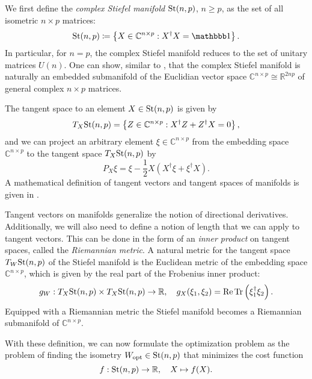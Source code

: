 \documentclass[encoding=utf8,british]{template/thesis}
\begin{document}
	We first define the \textit{complex Stiefel manifold} $\text{St}(n,p)$, $n \ge p$, as the set of all isometric $n\times p$ matrices:
	\begin{equation}
		\label{eq:Stiefel_manifold_definition}
		\Stiefel \coloneqq \left\{X\in\mathbb{C}^{n\times p}: X^\dagger X = \id\right\}.
	\end{equation}
	In particular, for $n = p$, the complex Stiefel manifold reduces to the set of unitary matrices $U(n)$. One can show, similar to \cite{cite:optimization_on_matrix_manifolds}, that the complex Stiefel manifold is naturally an embedded submanifold of the Euclidian vector space $\mathbb{C}^{n\times p} \cong \mathbb{R}^{2np}$ of general complex $n\times p$ matrices. \par
	The tangent space to an element $X\in\text{St}(n,p)$ is given by \cite{cite:optimization_on_matrix_manifolds, cite:riemannian_optimization_isometric_tensor_networks}
	\begin{equation}
		\label{eq:Stiefel_manifold_tangent_space}
		T_X \text{St}(n,p) = \left\{Z\in\mathbb{C}^{n\times p}:X^\dagger Z + Z^\dagger X = 0\right\},
	\end{equation}
	and we can project an arbitrary element $\xi \in \mathbb{C}^{n\times p}$ from the embedding space $\mathbb{C}^{n\times p}$ to the tangent space $T_X \text{St}(n,p)$ by \cite{cite:optimization_on_matrix_manifolds, cite:riemannian_optimization_isometric_tensor_networks}
	\begin{equation}
		\label{eq:Stiefel_manifold_project_to_tangent_space}
		P_X\xi = \xi - \frac{1}{2}X\left(X^\dagger\xi + \xi^\dagger X\right).
	\end{equation}
	A mathematical definition of tangent vectors and tangent spaces of manifolds is given in \cite{cite:optimization_on_matrix_manifolds}. \par
	Tangent vectors on manifolds generalize the notion of directional derivatives. Additionally, we will also need to define a notion of length that we can apply to tangent vectors. This can be done in the form of an \textit{inner product} on tangent spaces, called the \textit{Riemannian metric}. A natural metric for the tangent space $T_W \text{St}(n,p)$ of the Stiefel manifold is the Euclidean metric of the embedding space $\mathbb{C}^{n\times p}$, which is given by the real part of the Frobenius inner product:
	\begin{equation}
		\label{eq:Stiefel_manifold_riemannian_metric}
		g_W: T_X \text{St}(n,p) \times T_X \text{St}(n,p) \to \mathbb{R}, \quad g_X(\xi_1, \xi_2) = \operatorname{Re}\operatorname{Tr}\left(\xi_1^\dagger\xi_2\right).
	\end{equation}
	Equipped with a Riemannian metric the Stiefel manifold becomes a Riemannian submanifold of $\mathbb{C}^{n\times p}$. \par
	With these definition, we can now formulate the optimization problem as the problem of finding the isometry $W_\text{opt} \in \text{St}(n,p)$ that minimizes the cost function
	\begin{equation}
		\label{eq:Optimization_cost_function_definition}
		f: \text{St}(n,p) \to \mathbb{R}, \quad X \mapsto f(X).
	\end{equation}
\end{document}
